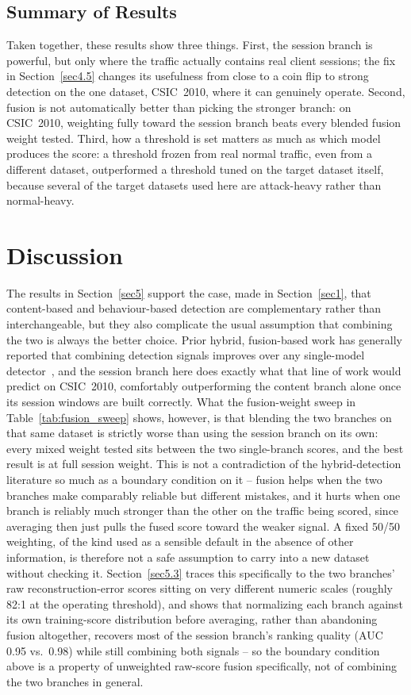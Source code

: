 \documentclass[futureinternet,article,submit,moreauthors]{Definitions/mdpi}
\begin{document}
\subsection{Summary of Results}

Taken together, these results show three things. First, the session branch is powerful, but only where the traffic actually contains real client sessions; the fix in Section~\ref{sec4.5} changes its usefulness from close to a coin flip to strong detection on the one dataset, CSIC~2010, where it can genuinely operate. Second, fusion is not automatically better than picking the stronger branch: on CSIC~2010, weighting fully toward the session branch beats every blended fusion weight tested. Third, how a threshold is set matters as much as which model produces the score: a threshold frozen from real normal traffic, even from a different dataset, outperformed a threshold tuned on the target dataset itself, because several of the target datasets used here are attack-heavy rather than normal-heavy.

\section{Discussion} \label{sec6}

The results in Section~\ref{sec5} support the case, made in Section~\ref{sec1}, that content-based and behaviour-based detection are complementary rather than interchangeable, but they also complicate the usual assumption that combining the two is always the better choice. Prior hybrid, fusion-based work has generally reported that combining detection signals improves over any single-model detector~\cite{kamal2025}, and the session branch here does exactly what that line of work would predict on CSIC~2010, comfortably outperforming the content branch alone once its session windows are built correctly. What the fusion-weight sweep in Table~\ref{tab:fusion_sweep} shows, however, is that blending the two branches on that same dataset is strictly worse than using the session branch on its own: every mixed weight tested sits between the two single-branch scores, and the best result is at full session weight. This is not a contradiction of the hybrid-detection literature so much as a boundary condition on it -- fusion helps when the two branches make comparably reliable but different mistakes, and it hurts when one branch is reliably much stronger than the other on the traffic being scored, since averaging then just pulls the fused score toward the weaker signal. A fixed 50/50 weighting, of the kind used as a sensible default in the absence of other information, is therefore not a safe assumption to carry into a new dataset without checking it. Section~\ref{sec5.3} traces this specifically to the two branches' raw reconstruction-error scores sitting on very different numeric scales (roughly 82:1 at the operating threshold), and shows that normalizing each branch against its own training-score distribution before averaging, rather than abandoning fusion altogether, recovers most of the session branch's ranking quality (AUC 0.95 vs.\ 0.98) while still combining both signals -- so the boundary condition above is a property of unweighted raw-score fusion specifically, not of combining the two branches in general.
\end{document}
